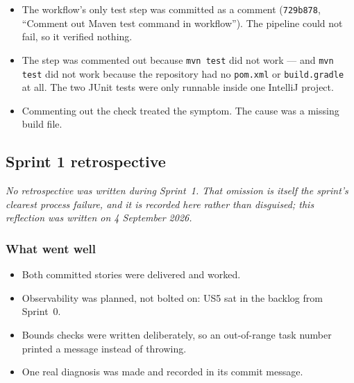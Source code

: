 \documentclass[11pt,a4paper]{article}
\newcommand{\code}[1]{\texttt{\small #1}}
\begin{document}
\begin{itemize}
  \item The workflow's only test step was committed as a comment
        (\code{729b878}, ``Comment out Maven test command in workflow''). The
        pipeline could not fail, so it verified nothing.
  \item The step was commented out because \code{mvn test} did not work --- and
        \code{mvn test} did not work because the repository had no
        \code{pom.xml} or \code{build.gradle} at all. The two JUnit tests were
        only runnable inside one IntelliJ project.
  \item Commenting out the check treated the symptom. The cause was a missing
        build file.
\end{itemize}

\subsection{Sprint 1 retrospective}

\noindent\textit{No retrospective was written during Sprint~1. That omission is
itself the sprint's clearest process failure, and it is recorded here rather
than disguised; this reflection was written on 4 September 2026.}

\subsubsection*{What went well}
\begin{itemize}
  \item Both committed stories were delivered and worked.
  \item Observability was planned, not bolted on: US5 sat in the backlog from
        Sprint~0.
  \item Bounds checks were written deliberately, so an out-of-range task number
        printed a message instead of throwing.
  \item One real diagnosis was made and recorded in its commit message.
\end{itemize}
\end{document}
